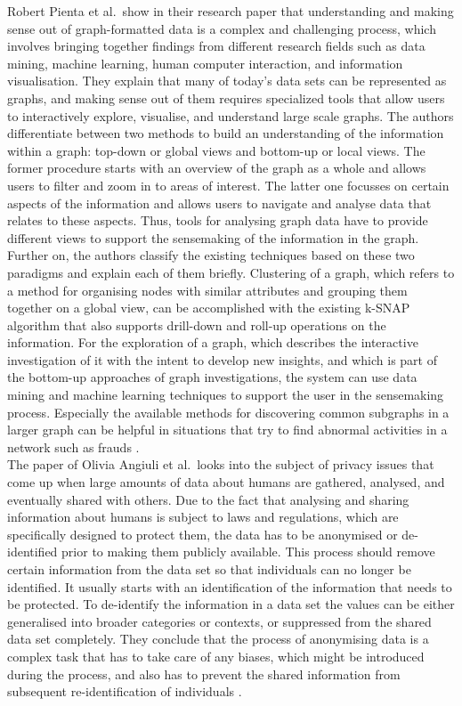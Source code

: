 Robert Pienta et al.\ show in their research paper that understanding and making sense out of graph-formatted data is a complex and challenging process, which involves bringing together findings from different research fields such as data mining, machine learning, human computer interaction, and information visualisation. They explain that many of today’s data sets can be represented as graphs, and making sense out of them requires specialized tools that allow users to interactively explore, visualise, and understand large scale graphs. The authors differentiate between two methods to build an understanding of the information within a graph: top-down or global views and bottom-up or local views. The former procedure starts with an overview of the graph as a whole and allows users to filter and zoom in to areas of interest. The latter one focusses on certain aspects of the information and allows users to navigate and analyse data that relates to these aspects. Thus, tools for analysing graph data have to provide different views to support the sensemaking of the information in the graph. Further on, the authors classify the existing techniques based on these two paradigms and explain each of them briefly. Clustering of a graph, which refers to a method for organising nodes with similar attributes and grouping them together on a global view, can be accomplished with the existing k-SNAP algorithm that also supports drill-down and roll-up operations on the information. For the exploration of a graph, which describes the interactive investigation of it with the intent to develop new insights, and which is part of the bottom-up approaches of graph investigations, the system can use data mining and machine learning techniques to support the user in the sensemaking process. Especially the available methods for discovering common subgraphs in a larger graph can be helpful in situations that try to find abnormal activities in a network such as frauds \citep{pienta2015scalable}. \\

The paper of Olivia Angiuli et al.\ looks into the subject of privacy issues that come up when large amounts of data about humans are gathered, analysed, and eventually shared with others. Due to the fact that analysing and sharing information about humans is subject to laws and regulations, which are specifically designed to protect them, the data has to be anonymised or de-identified prior to making them publicly available. This process should remove certain information from the data set so that individuals can no longer be identified. It usually starts with an identification of the information that needs to be protected. To de-identify the information in a data set the values can be either generalised into broader categories or contexts, or suppressed from the shared data set completely. They conclude that the process of anonymising data is a complex task that has to take care of any biases, which might be introduced during the process, and also has to prevent the shared information from subsequent re-identification of individuals \citep{angiuli2015identify}.


